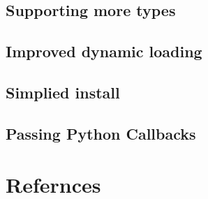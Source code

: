 \documentclass[11pt, letterpaper, oneside, twocolumn] {article}
\begin{document}
\subsection{Supporting more types}


\subsection{Improved dynamic loading}


\subsection{Simplied install}


\subsection{Passing Python Callbacks}

\section{Refernces}

\end{document}
